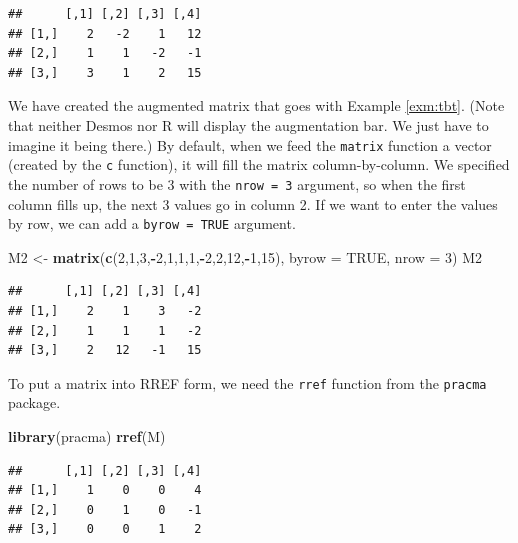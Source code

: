 \documentclass[
]{book}
\newenvironment{Shaded}{\begin{snugshade}}{\end{snugshade}}
\newcommand{\AttributeTok}[1]{\textcolor[rgb]{0.13,0.29,0.53}{#1}}
\newcommand{\ConstantTok}[1]{\textcolor[rgb]{0.56,0.35,0.01}{#1}}
\newcommand{\DecValTok}[1]{\textcolor[rgb]{0.00,0.00,0.81}{#1}}
\newcommand{\FunctionTok}[1]{\textcolor[rgb]{0.13,0.29,0.53}{\textbf{#1}}}
\newcommand{\NormalTok}[1]{#1}
\newcommand{\OtherTok}[1]{\textcolor[rgb]{0.56,0.35,0.01}{#1}}
\newcommand{\SpecialCharTok}[1]{\textcolor[rgb]{0.81,0.36,0.00}{\textbf{#1}}}
\theoremstyle{definition}
\theoremstyle{definition}
\theoremstyle{definition}
\theoremstyle{definition}
\theoremstyle{remark}
\begin{document}
\begin{verbatim}
##      [,1] [,2] [,3] [,4]
## [1,]    2   -2    1   12
## [2,]    1    1   -2   -1
## [3,]    3    1    2   15
\end{verbatim}

We have created the augmented matrix that goes with Example \ref{exm:tbt}. (Note that neither Desmos nor R will display the augmentation bar. We just have to imagine it being there.) By default, when we feed the \texttt{matrix} function a vector (created by the \texttt{c} function), it will fill the matrix column-by-column. We specified the number of rows to be 3 with the \texttt{nrow\ =\ 3} argument, so when the first column fills up, the next 3 values go in column 2. If we want to enter the values by row, we can add a \texttt{byrow\ =\ TRUE} argument.

\begin{Shaded}
\begin{Highlighting}[]
\NormalTok{M2 }\OtherTok{\textless{}{-}} \FunctionTok{matrix}\NormalTok{(}\FunctionTok{c}\NormalTok{(}\DecValTok{2}\NormalTok{,}\DecValTok{1}\NormalTok{,}\DecValTok{3}\NormalTok{,}\SpecialCharTok{{-}}\DecValTok{2}\NormalTok{,}\DecValTok{1}\NormalTok{,}\DecValTok{1}\NormalTok{,}\DecValTok{1}\NormalTok{,}\SpecialCharTok{{-}}\DecValTok{2}\NormalTok{,}\DecValTok{2}\NormalTok{,}\DecValTok{12}\NormalTok{,}\SpecialCharTok{{-}}\DecValTok{1}\NormalTok{,}\DecValTok{15}\NormalTok{), }\AttributeTok{byrow =} \ConstantTok{TRUE}\NormalTok{,  }
              \AttributeTok{nrow =} \DecValTok{3}\NormalTok{)}
\NormalTok{M2}
\end{Highlighting}
\end{Shaded}

\begin{verbatim}
##      [,1] [,2] [,3] [,4]
## [1,]    2    1    3   -2
## [2,]    1    1    1   -2
## [3,]    2   12   -1   15
\end{verbatim}

To put a matrix into RREF form, we need the \texttt{rref} function from the \texttt{pracma} package.

\begin{Shaded}
\begin{Highlighting}[]
\FunctionTok{library}\NormalTok{(pracma)}
\FunctionTok{rref}\NormalTok{(M)}
\end{Highlighting}
\end{Shaded}

\begin{verbatim}
##      [,1] [,2] [,3] [,4]
## [1,]    1    0    0    4
## [2,]    0    1    0   -1
## [3,]    0    0    1    2
\end{verbatim}
\end{document}
